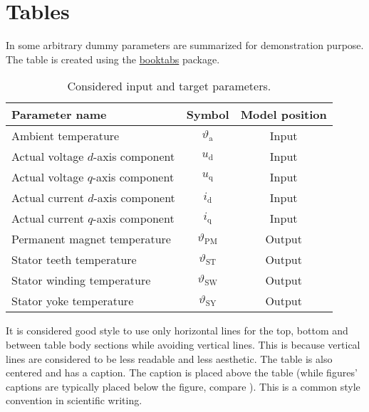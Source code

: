 \section{Tables}
\label{sec:features}
In  some arbitrary dummy parameters are summarized for demonstration purpose. The table is created using the \href{https://ctan.org/pkg/booktabs}{booktabs} package.
\begin{table}[htb]
	\caption{Considered input and target parameters.}
	\label{tab:params}
	\centering
	\begin{tabular}{l c c}
		\toprule
		Parameter name & Symbol & Model position \\
		\midrule
		Ambient temperature & $\vartheta_\mathrm{a}$ & Input \\
		Actual voltage $d$-axis component & $u_\mathrm{d}$ & Input \\
		Actual voltage $q$-axis component & $u_\mathrm{q}$ & Input \\
		Actual current $d$-axis component & $i_\mathrm{d}$ & Input \\
		Actual current $q$-axis component & $i_\mathrm{q}$ & Input \\
		\hline
		Permanent magnet temperature & $\vartheta_{\mathrm{PM}}$ & Output \\
		Stator teeth temperature & $\vartheta_{\mathrm{ST}}$ & Output \\
		Stator winding temperature & $\vartheta_{\mathrm{SW}}$ & Output \\
		Stator yoke temperature & $\vartheta_{\mathrm{SY}}$ & Output\\
		\bottomrule
	 \end{tabular}
\end{table}

 It is considered good style to use only horizontal lines for the top, bottom and between table body sections while avoiding vertical lines. This is because vertical lines are considered to be less readable and less aesthetic. The table is also centered and has a caption. The caption is placed above the table (while figures' captions are typically placed below the figure, compare ). This is a common style convention in scientific writing. 



